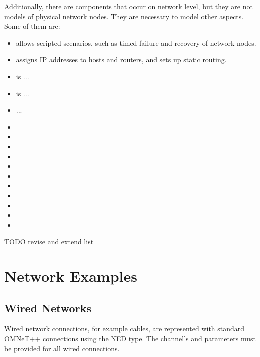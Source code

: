Additionally, there are components that occur on network level, but they
are not models of physical network nodes. They are necessary 
to model other aspects. Some of them are:

\begin{itemize}
  \item {} allows scripted scenarios, such
     as timed failure and recovery of network nodes.
  \item {} assigns IP addresses 
     to hosts and routers, and sets up static routing.
\item {} is ...
\item {} is ...
\item ...
\item {}
\item {}
\item {}
\item {}
\item {}
\item {}
\item {}
\item {}
\item {}
\item {}
\item {}

\end{itemize}

TODO revise and extend list

\section{Network Examples}

\subsection{Wired Networks}

Wired network connections, for example  cables, are
represented with standard OMNeT++ connections using the
 NED type. The channel's  and
 parameters must be provided for all wired connections.

